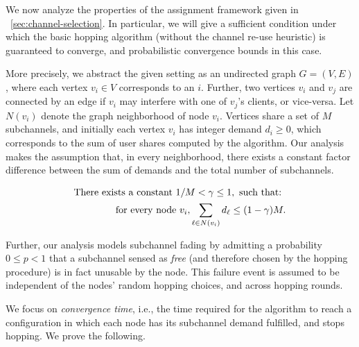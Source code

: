 
We now analyze the properties of the assignment framework given in ~\ref{sec:channel-selection}. 
In particular, we will give a sufficient condition under which the basic hopping algorithm 
(without the channel re-use heuristic) is guaranteed to converge, 
and probabilistic convergence bounds in this case. 

More precisely, we abstract the given setting as an undirected graph $G = (V, E)$, where each vertex $v_i \in V$ corresponds to an \eNB $i$. 
Further, two vertices $v_i$ and $v_j$ are connected by an edge if $v_i$ may interfere with one of $v_j$'s clients, or vice-versa. 
Let $N(v_i)$ denote the graph neighborhood of node $v_i$. 
Vertices share a set of $M$ subchannels, and initially each vertex $v_i$ has integer demand $d_i \geq 0$, which corresponds to the sum of user shares computed by the algorithm. 
Our analysis makes the assumption that, in every neighborhood, there exists a constant factor difference between the sum of demands and the total number of  subchannels.

\begin{eqnarray*}
  \textnormal{There exists a constant } 1 / M < \gamma \leq 1, \textnormal{ such that: } \\ \textnormal{ for every node }  v_i, \sum_{\ell \in N(v_i)} d_\ell \leq (1 - \gamma) M.
\end{eqnarray*}

Further, our analysis models subchannel fading by admitting a probability $0 \leq p < 1$ that a subchannel sensed as \emph{free} (and therefore chosen by the hopping procedure) is in fact unusable by the node. 
This failure event is assumed to be independent of the nodes' random hopping choices, and across hopping rounds. 

We focus on \emph{convergence time}, i.e., the time required for the algorithm to reach a configuration in which each node has its subchannel demand fulfilled, and stops hopping. 
We prove the following. 

